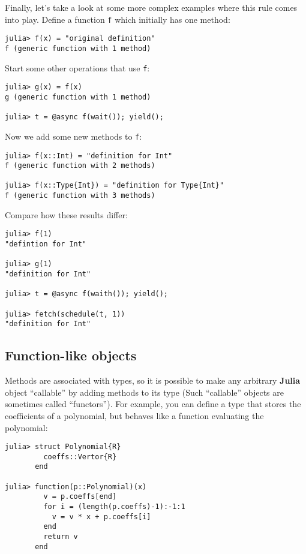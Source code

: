 \documentclass[
]{article}
\begin{document}
Finally, let's take a look at some more complex examples where this rule
comes into play. Define a function \texttt{f} which initially has one
method:

\begin{verbatim}
julia> f(x) = "original definition"
f (generic function with 1 method)
\end{verbatim}

Start some other operations that use \texttt{f}:

\begin{verbatim}
julia> g(x) = f(x)
g (generic function with 1 method)

julia> t = @async f(wait()); yield();
\end{verbatim}

Now we add some new methods to \texttt{f}:

\begin{verbatim}
julia> f(x::Int) = "definition for Int"
f (generic function with 2 methods)

julia> f(x::Type{Int}) = "definition for Type{Int}"
f (generic function with 3 methods)
\end{verbatim}

Compare how these results differ:

\begin{verbatim}
julia> f(1)
"defintion for Int"

julia> g(1)
"definition for Int"

julia> t = @async f(waith()); yield();

julia> fetch(schedule(t, 1))
"definition for Int"
\end{verbatim}

\hypertarget{function-like-objects}{%
\subsection{Function-like objects}\label{function-like-objects}}

Methods are associated with types, so it is possible to make any
arbitrary \textbf{Julia} object ``callable'' by adding methods to its
type (Such ``callable'' objects are sometimes called ``functors''). For
example, you can define a type that stores the coefficients of a
polynomial, but behaves like a function evaluating the polynomial:

\begin{verbatim}
julia> struct Polynomial{R}
         coeffs::Vertor{R}
       end

julia> function(p::Polynomial)(x)
         v = p.coeffs[end]
         for i = (length(p.coeffs)-1):-1:1
           v = v * x + p.coeffs[i]
         end
         return v
       end
\end{verbatim}
\end{document}
